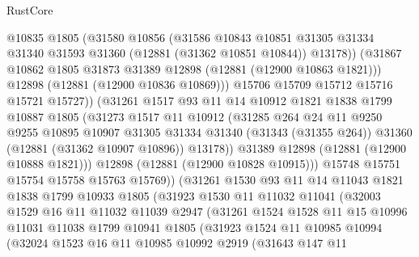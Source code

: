 \begin{lexlean}{RustCore}
\begin{coremodule}
                  @10835
                  @1805
                  (@31580
                    @10856
                    (@31586
                      @10843
                      @10851
                      @31305
                      @31334
                      @31340
                      @31593
                      @31360
                      (@12881 (@31362 @10851 @10844))
                      @13178))
                  (@31867 @10862 @1805 @31873 @31389 @12898 (@12881 (@12900 @10863 @1821)))
                  @12898
                  (@12881 (@12900 @10836 @10869)))
                @15706
                @15709
                @15712
                @15716
                @15721
                @15727))
            (@31261
              @1517
              @93
              @11
              @14
              @10912
              @1821
              @1838
              @1799
              @10887
              @1805
              (@31273
                @1517
                @11
                @10912
                (@31285
                  @264
                  @24
                  @11
                  @9250
                  @9255
                  @10895
                  @10907
                  @31305
                  @31334
                  @31340
                  (@31343 (@31355 @264))
                  @31360
                  (@12881 (@31362 @10907 @10896))
                  @13178))
              @31389
              @12898
              (@12881 (@12900 @10888 @1821)))
            @12898
            (@12881 (@12900 @10828 @10915)))
          @15748
          @15751
          @15754
          @15758
          @15763
          @15769))
      (@31261
        @1530
        @93
        @11
        @14
        @11043
        @1821
        @1838
        @1799
        @10933
        @1805
        (@31923
          @1530
          @11
          @11032
          @11041
          (@32003
            @1529
            @16
            @11
            @11032
            @11039
            @2947
            (@31261
              @1524
              @1528
              @11
              @15
              @10996
              @11031
              @11038
              @1799
              @10941
              @1805
              (@31923
                @1524
                @11
                @10985
                @10994
                (@32024
                  @1523
                  @16
                  @11
                  @10985
                  @10992
                  @2919
                  (@31643
                    @147
                    @11

\end{coremodule}
\end{lexlean}
